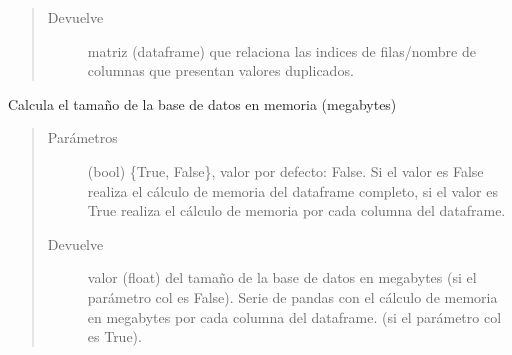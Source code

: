 \documentclass[letterpaper,10pt,openany,spanish]{sphinxmanual}
\begin{document}
\begin{fulllineitems}
\begin{fulllineitems}
\begin{quote}
\begin{description}
\item[{Devuelve}] \leavevmode
matriz (dataframe) que relaciona las indices de filas/nombre             de columnas que presentan valores duplicados.

\end{description}\end{quote}

\end{fulllineitems}


\begin{fulllineitems}
\label{\detokenize{calidad_datos:calidad_datos.CalidadDatos.Memoria}}
Calcula el tamaño de la base de datos en memoria (megabytes)
\begin{quote}\begin{description}
\item[{Parámetros}] \leavevmode
{} \textendash{} (bool) \{True, False\}, valor por defecto: False. Si el             valor es False realiza el cálculo de memoria del dataframe             completo, si el valor es True realiza el cálculo de memoria por             cada columna del dataframe.

\item[{Devuelve}] \leavevmode
valor (float) del tamaño de la base de datos en megabytes             (si el parámetro col es False). Serie de pandas con el cálculo de             memoria en megabytes por cada columna del dataframe. (si el             parámetro col es True).

\end{description}\end{quote}

\end{fulllineitems}



\end{fulllineitems}
\end{document}
